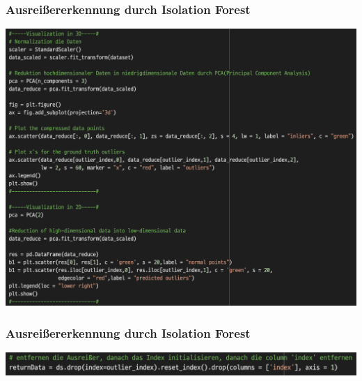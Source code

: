 \documentclass{beamer}
\begin{document}
    \begin{frame}
        \frametitle{Ausreißererkennung durch Isolation Forest}
        \centering
        \includegraphics[scale=0.35]{visualisieren.png}
    \end{frame}
    
    \begin{frame}
        \frametitle{Ausreißererkennung durch Isolation Forest}
        \centering
        \includegraphics[scale=0.45]{weiterverarbeiten.png}
    \end{frame}
    
\end{document}
